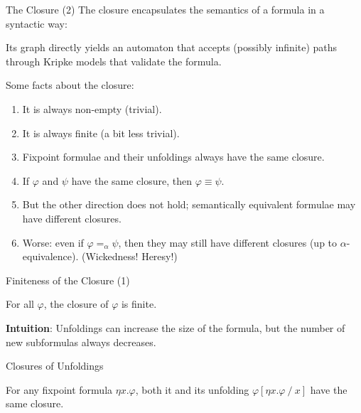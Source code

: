 \documentclass[aspectratio=169]{beamer}
\begin{document}
\begin{frame}{The Closure (2)}
  The closure encapsulates the semantics of a formula in a syntactic way:

  \bigskip

  Its graph directly yields an automaton that accepts (possibly infinite) paths through Kripke models that validate the formula.

  \bigskip

  Some facts about the closure:
          \smallskip

  \begin{enumerate}
    \item It is always non-empty (trivial).
          \smallskip
          \pause
    \item It is always finite (a bit less trivial).
          \smallskip
          \pause
    \item Fixpoint formulae and their unfoldings always have the same closure.
          \smallskip
          \pause
    \item If $\varphi$ and $\psi$ have the same closure, then $\varphi \equiv \psi$.
          \smallskip
          \pause
    \item But the other direction does not hold; semantically equivalent formulae may have different closures.
          \smallskip
          \pause
    \item Worse: even if $\varphi =_{\alpha} \psi$, then they may still have different closures (up to $\alpha$-equivalence). (Wickedness! Heresy!)
  \end{enumerate}



\end{frame}

\begin{frame}{Finiteness of the Closure (1)}
  \begin{theorem}
    For all $\varphi$, the closure of $\varphi$ is finite.
  \end{theorem}
  \bigskip
  \textbf{Intuition}: Unfoldings can increase the size of the formula, but the number of new subformulas always decreases.

  \vspace{10em}

\end{frame}

\begin{frame}{Closures of Unfoldings}
  \begin{theorem}
    \item For any fixpoint formula $\eta x. \varphi$, both it and its unfolding $\varphi [ \eta x. \varphi~/~x ]$ have the same closure.
  \end{theorem}

  \vspace{14em}

\end{frame}
\end{document}
